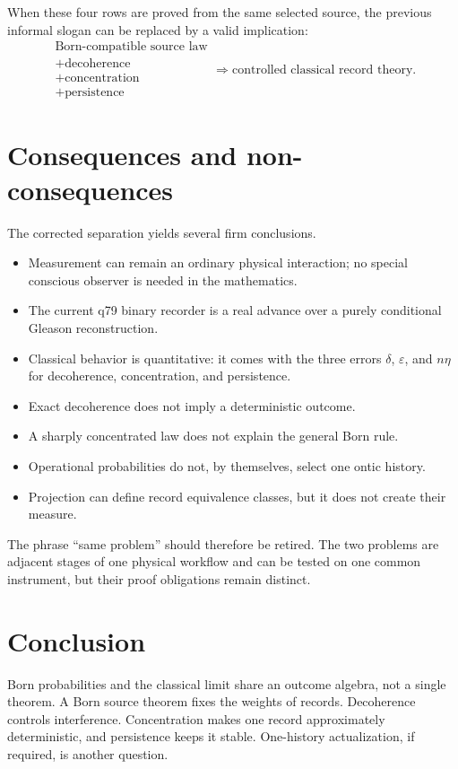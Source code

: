 \documentclass[11pt]{article}
\begin{document}
When these four rows are proved from the same selected source, the previous
informal slogan can be replaced by a valid implication:
\[
\begin{gathered}
\text{Born-compatible source law}\\
+\text{decoherence}\\
+\text{concentration}\\
+\text{persistence}
\end{gathered}
\Longrightarrow
\text{controlled classical record theory}.
\]

\section{Consequences and non-consequences}

The corrected separation yields several firm conclusions.

\begin{itemize}
\item Measurement can remain an ordinary physical interaction; no special
conscious observer is needed in the mathematics.
\item The current q79 binary recorder is a real advance over a purely
conditional Gleason reconstruction.
\item Classical behavior is quantitative: it comes with the three errors
\(\delta\), \(\varepsilon\), and \(n\eta\) for decoherence, concentration, and
persistence.
\item Exact decoherence does not imply a deterministic outcome.
\item A sharply concentrated law does not explain the general Born rule.
\item Operational probabilities do not, by themselves, select one ontic
history.
\item Projection can define record equivalence classes, but it does not create
their measure.
\end{itemize}

The phrase ``same problem'' should therefore be retired. The two problems are
adjacent stages of one physical workflow and can be tested on one common
instrument, but their proof obligations remain distinct.

\section{Conclusion}

Born probabilities and the classical limit share an outcome algebra, not a
single theorem. A Born source theorem fixes the weights of records. Decoherence
controls interference. Concentration makes one record approximately
deterministic, and persistence keeps it stable. One-history actualization, if
required, is another question.
\end{document}
